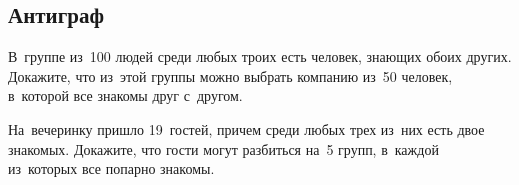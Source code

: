 \subsection*{Антиграф}

\begin{problems}

\item
В~группе из~100 людей среди любых троих есть человек, знающих обоих других.
Докажите, что из~этой группы можно выбрать компанию из~50 человек, в~которой
все знакомы друг с~другом.

\item
На~вечеринку пришло 19~гостей, причем среди любых трех из~них есть двое
знакомых.
Докажите, что гости могут разбиться на~5 групп, в~каждой из~которых все попарно
знакомы.

\end{problems}

